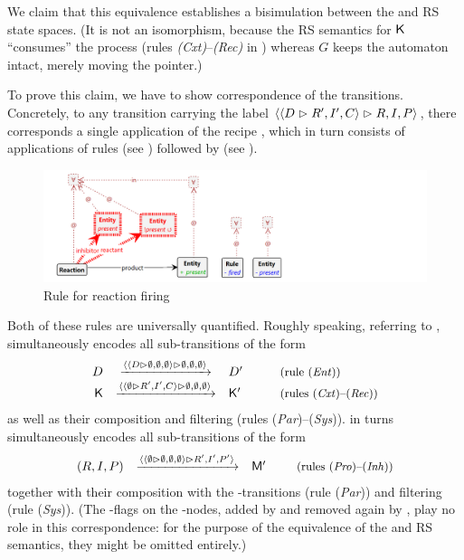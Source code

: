 We claim that this equivalence establishes a bisimulation between the \GROOVE and RS state spaces. (It is not an isomorphism, because the RS semantics for $\textsf K$ ``consumes'' the process (rules \textit{(Cxt)}--\textit{(Rec)} in ) whereas $G$ keeps the automaton intact, merely moving the \current pointer.)

To prove this claim, we have to show correspondence of the transitions. Concretely, to any transition carrying the label $\langle \langle D\vartriangleright R',I',C\rangle\vartriangleright R,I,P\rangle$, there corresponds a single application of the recipe \fireR, which in turn consists of applications of rules \contextR (see ) followed by \reactR (see ).

%
\begin{figure}
\centering
\includegraphics[scale=.2]{figs/react}
\caption{Rule for reaction firing}
\label{fig:react}
\end{figure}
%
Both of these rules are universally quantified. Roughly speaking, referring to , \contextR simultaneously encodes all sub-transitions of the form
%
\[\begin{array}{rcll}
D & \xrightarrow{\obs{\obs{D}{\emptyset,\emptyset,\emptyset}}
                     {\emptyset,\emptyset,\emptyset}} & D'
  & \quad\text{\small{(rule (\textit{Ent}))}} \\
\mathsf K
  & \xrightarrow{\obs{\obs{\emptyset}{R',I',C}}
                     {\emptyset,\emptyset,\emptyset}} & \mathsf K'
  & \quad\text{\small{(rules (\textit{Cxt})--(\textit{Rec}))}}
\end{array}\]
%
as well as their composition and filtering (rules (\textit{Par})--(\textit{Sys})). \reactR in turns simultaneously encodes all sub-transitions of the form
%
\[\begin{array}{rcll}
(R,I,P)
  & \xrightarrow{\obs{\obs{\emptyset}
                     {\emptyset,\emptyset,\emptyset}}{R',I',P'}} & \mathsf M'
  & \enspace\text{\small{(rules (\textit{Pro})--(\textit{Inh}))}}
\end{array}\]
%
together with their composition with the \contextR-transitions (rule (\textit{Par})) and filtering (rule (\textit{Sys})). (The \fired-flags on the \Step-nodes, added by \contextR and removed again by \reactR, play no role in this correspondence: for the purpose of the equivalence of the \GROOVE and RS semantics, they might be omitted entirely.)


